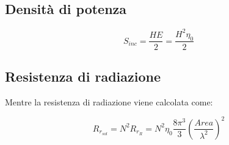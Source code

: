 \documentclass[10pt,a4paper]{report}
\begin{document}
			\subsection{Densità di potenza}

			 	\begin{equation}
			 	S_{inc}=\frac{HE}{2}=\frac{H^2\eta_0}{2}
			 	\end{equation}

			\subsection{Resistenza di radiazione}
				 Mentre la resistenza di radiazione viene calcolata come:

				 \begin{equation}
				 R_{r_{sol}}=N^2R_{r_{R}}=N^2\eta_0\frac{8\pi^3}{3}(\frac{Area}{\lambda^2})^2
				 \end{equation}


        \newpage
        \null 
        \thispagestyle{empty} 
        \newpage
        
        \newpage
        \null 
        \thispagestyle{empty} 
        \newpage
\end{document}
